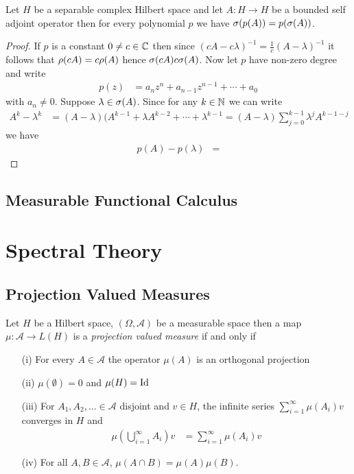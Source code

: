 \begin{lem}\label{hilbert:SpectralMappingPolynomialBoundedSelfAdjoint}Let $H$ be a separable complex Hilbert space and let $A :H \to H$ be a bounded self adjoint operator then for every polynomial $p$ we have $\sigma(p(A)) = p(\sigma(A))$.
\end{lem}
\begin{proof}
If $p$ is a constant $0 \neq c \in \mathbb{C}$ then since $(c A - c \lambda)^{-1}  = \frac{1}{c} (A - \lambda)^{-1}$ it follows that $\rho(cA) = c \rho(A)$ hence $\sigma(cA) c\sigma(A)$.  Now let $p$ have non-zero degree and write 
\begin{align*}
p(z) &= a_n z^n + a_{n-1} z^{n-1} + \dotsb + a_0
\end{align*}
with $a_n \neq 0$.  Suppose $\lambda \in \sigma(A)$.  Since for any $k \in \mathbb{N}$ we can write
\begin{align*}
A^k - \lambda^k &= (A - \lambda) (A^{k-1} + \lambda A^{k-2} + \dotsb + \lambda^{k-1} = (A - \lambda) \sum_{j=0}^{k-1} \lambda^{j} A^{k-1-j}
\end{align*}
we have
\begin{align*}
p(A) - p(\lambda) &= 
\end{align*}
\end{proof}

\subsection{Measurable Functional Calculus}

\section{Spectral Theory}

\subsection{Projection Valued Measures}

\begin{defn}Let $H$ be a Hilbert space, $(\Omega, \mathcal{A})$ be a measurable space then a map $\mu : \mathcal{A} \to L(H)$ is a 
\emph{projection valued measure} if and only if 
\begin{itemize}
\item[(i)] For every $A \in \mathcal{A}$ the operator $\mu(A)$ is an orthogonal projection
\item[(ii)] $\mu(\emptyset) = 0$ and $\mu(H) = \operatorname*{Id}$
\item[(iii)] For $A_1, A_2, \dots \in \mathcal{A}$ disjoint and $v \in H$, the infinite series $\sum_{i=1}^\infty \mu(A_i)v$ converges in $H$ and 
\begin{align*}
\mu(\bigcup_{i=1}^\infty A_i)  v &= \sum_{i=1}^\infty \mu(A_i)v
\end{align*}
\item[(iv)]For all $A,B \in \mathcal{A}$, $\mu(A \cap B) = \mu(A) \mu(B)$.
\end{itemize}
\end{defn}


